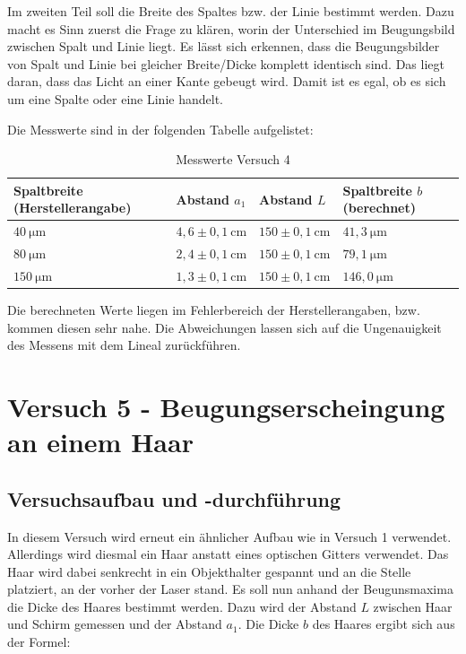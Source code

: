         Im zweiten Teil soll die Breite des Spaltes bzw. der Linie bestimmt werden. Dazu macht es Sinn zuerst die Frage zu klären, worin der Unterschied im Beugungsbild zwischen Spalt und Linie liegt. Es lässt sich erkennen, dass die Beugungsbilder von Spalt und Linie bei gleicher Breite/Dicke komplett identisch sind. Das liegt daran, dass das Licht an einer Kante gebeugt wird. Damit ist es egal, ob es sich um eine Spalte oder eine Linie handelt.
        
        Die Messwerte sind in der folgenden Tabelle aufgelistet:

        \begin{table}[H]
            \centering
            \caption{Messwerte Versuch 4}
            \vspace*{1em}
            \begin{tabular}{|l|l|l|l|}
                \hline
                Spaltbreite (Herstellerangabe) & Abstand $a_{1}$ & Abstand $L$ & Spaltbreite $b$ (berechnet)\\
                \hline
                $40\ \mathrm{\mu m}$ & $4,6 \pm 0,1\ \mathrm{cm}$ & $150 \pm 0,1\ \mathrm{cm}$ & $41,3\ \mathrm{\mu m}$\\
                \hline
                $80\ \mathrm{\mu m}$ & $2,4 \pm 0,1\ \mathrm{cm}$ & $150 \pm 0,1\ \mathrm{cm}$ & $79,1\ \mathrm{\mu m}$\\
                \hline
                $150\ \mathrm{\mu m}$ & $1,3 \pm 0,1\ \mathrm{cm}$ & $150 \pm 0,1\ \mathrm{cm}$ & $146,0\ \mathrm{\mu m}$\\
                \hline
            \end{tabular}
        \end{table}

        Die berechneten Werte liegen im Fehlerbereich der Herstellerangaben, bzw. kommen diesen sehr nahe. Die Abweichungen lassen sich auf die Ungenauigkeit des Messens mit dem Lineal zurückführen.

\section{Versuch 5 - Beugungserscheingung an einem Haar}
    
    \subsection{Versuchsaufbau und -durchführung}
        
        In diesem Versuch wird erneut ein ähnlicher Aufbau wie in Versuch 1 verwendet. Allerdings wird diesmal ein Haar anstatt eines optischen Gitters verwendet. Das Haar wird dabei senkrecht in ein Objekthalter gespannt und an die Stelle platziert, an der vorher der Laser stand.
        Es soll nun anhand der Beugunsmaxima die Dicke des Haares bestimmt werden. Dazu wird der Abstand $L$ zwischen Haar und Schirm gemessen und der Abstand $a_{1}$. Die Dicke $b$ des Haares ergibt sich aus der Formel:

